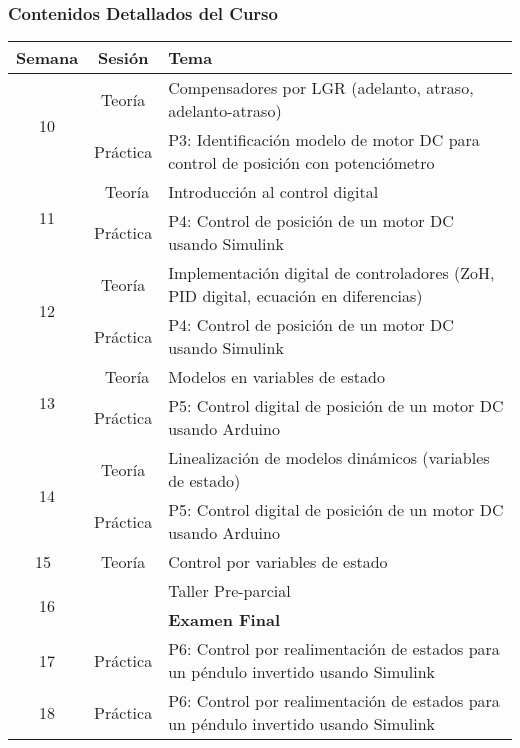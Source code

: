 \documentclass[aspectratio=169]{beamer}
\theoremstyle{definition}
\theoremstyle{plain}
\theoremstyle{remark}
\begin{document}
\begin{frame}[c]\frametitle{Contenidos Detallados del Curso}
\centering
\scriptsize
\begin{tabular}{c|c|p{11cm}}
  \textbf{Semana} & \textbf{Sesión} & \textbf{Tema} \\
  \hline
  \multirow{2}{*}{10} & Teoría     & Compensadores por LGR (adelanto, atraso, adelanto-atraso)\\
                      & Práctica   & P3: Identificación modelo de motor DC para control de posición con potenciómetro \\
  \hline
  \multirow{2}{*}{11} & Teoría     & Introducción al control digital \\
                      & Práctica   & P4: Control de posición de un motor DC usando Simulink \\
  \hline                    
  \multirow{2}{*}{12} & Teoría     & Implementación digital de controladores (ZoH, PID digital, ecuación en diferencias) \\
                      & Práctica   & P4: Control de posición de un motor DC usando Simulink \\
  \hline                      
  \multirow{2}{*}{13} & Teoría     & Modelos en variables de estado \\
                      & Práctica   & P5: Control digital de posición de un motor DC usando Arduino \\
  \hline                    
  \multirow{2}{*}{14} & Teoría     & Linealización de modelos dinámicos (variables de estado) \\
                      & Práctica   & P5: Control digital de posición de un motor DC usando Arduino \\
  \hline                    
  15  & Teoría & Control por variables de estado \\
  \hline                    
  \multirow{2}{*}{16} &            & Taller Pre-parcial \\
                      &            & \textbf{Examen Final} \\
  \hline                    
  17  & Práctica & P6: Control por realimentación de estados para un péndulo invertido usando Simulink \\
  \hline                    
  18  & Práctica & P6: Control por realimentación de estados para un péndulo invertido usando Simulink \\
\end{tabular}
\end{frame}
\end{document}
